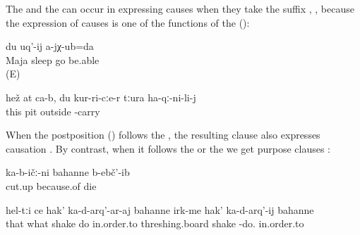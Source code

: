 The  and the  can occur in  expressing causes when they take the  suffix , , because the expression of causes is one of the functions of the  ():
%
\begin{exe}
	\ex	\label{ex:ecause Maja was sleeping I (masc.) could not come.}
		du	uq'-ij	a-jχ-ub=da\\
		Maja	sleep		go	be.able\\
	\glt	{} (E)

	\ex	\label{ex:This is for you, because you helped me out of the pit}
	\gll	hež	at	ca-b,	du	kur-ri-cːe-r	tːura	ha-qː-ni-li-j\\
		this				pit	outside	-carry\\
	\glt	{}
\end{exe}

When the postposition   () follows the , the resulting clause also expresses causation . By contrast, when it follows the  or the  we get purpose clauses :
%
\begin{exe}
	\ex	\label{ex:‎Because they cut it, they died}
	\gll	ka-b-ičː-ni	bahanne	b-ebč'-ib\\
		cut.up	because.of	die\\
	\glt	{}


	\ex	\label{ex:‎in order to shake those, in order to shake the threshing boards}
	\gll	hel-tːi	ce	hak'	ka-d-arq'-ar-aj	bahanne	irk-me	hak'	ka-d-arq'-ij	bahanne\\
		that	what	shake	do	in.order.to	threshing.board	shake	-do.	in.order.to\\
	\glt	{}
\end{exe}


